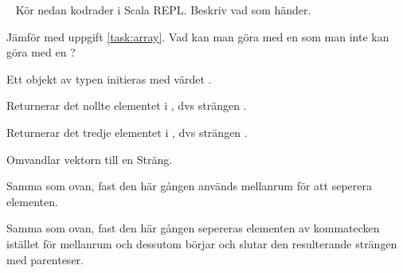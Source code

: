 




\QUESTBEGIN

\Task  \what~  Kör nedan kodrader i Scala REPL. Beskriv vad som händer.

\Subtask {}

\Subtask {}

\Subtask {}

\Subtask {}

\Subtask {}

\Subtask {}

\Subtask {}

\Subtask {}

\Subtask {}

\Subtask {}

\Subtask {}

\Subtask {}

\Subtask {}

\Subtask {}

\Subtask\Pen Jämför med uppgift \ref{task:array}. Vad kan man göra med en  som man inte kan göra med en ?

\SOLUTION


\TaskSolved \what
 

\SubtaskSolved  Ett objekt av typen  initieras med värdet .

\SubtaskSolved  Returnerar det nollte elementet i , dvs strängen .

\SubtaskSolved  Returnerar det tredje elementet i , dvs strängen \code{!}.

\SubtaskSolved  Omvandlar vektorn till en Sträng.

\SubtaskSolved  Samma som ovan, fast den här gången används mellanrum för att seperera elementen.

\SubtaskSolved  Samma som ovan, fast den här gången sepereras elementen av kommatecken istället för mellanrum och dessutom börjar och slutar den resulterande strängen med parenteser.

